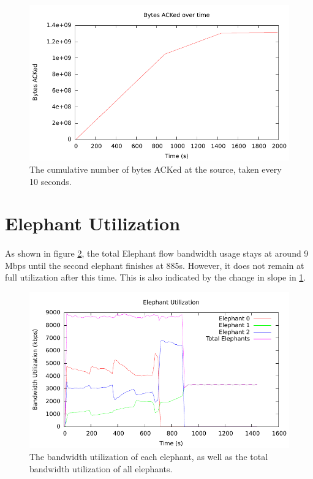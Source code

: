 \documentclass{article}
\begin{document}
    \begin{figure}[h]
      \begin{centering}
        \includegraphics{ack_plot}
        \caption{The cumulative number of bytes ACKed at the source, taken every 10 seconds.}
        \label{fig:ack_plot}
      \end{centering}
    \end{figure}

  \section{Elephant Utilization}

    \paragraph{}
      As shown in figure \ref{fig:elephant_bw}, the total Elephant flow bandwidth usage stays at around 9 Mbps until the second elephant finishes at 885s.
      However, it does not remain at full utilization after this time.
      This is also indicated by the change in slope in \ref{fig:ack_plot}.

    \begin{figure}[h]
      \begin{center}
        \includegraphics{elephant_bw}
        \caption{The bandwidth utilization of each elephant, as well as the total bandwidth utilization of all elephants.}
        \label{fig:elephant_bw}
      \end{center}
    \end{figure}

    \subsection{}
\end{document}
